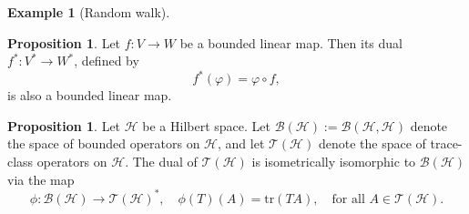 \documentclass[10pt,a4paper]{amsart}
\theoremstyle{definition}
\theoremstyle{definition}
\newtheorem{example}[definition]{Example}
\theoremstyle{definition}
\theoremstyle{definition}
\newtheorem{proposition}[definition]{Proposition}
\theoremstyle{definition}
\theoremstyle{definition}
\begin{document}
\begin{example}[Random walk]










\begin{proposition} \cite[Proposition 2.3.10]{pedersenAnalysisNow1989}
Let \( f : V \to W \) be a bounded linear map. Then its dual \( f^* : V^* \to W^* \), defined by
\[
f^*(\varphi) = \varphi \circ f,
\]
is also a bounded linear map.
\end{proposition}

\begin{proposition} \cite[Theorem 19.2]{conwayCourseOperatorTheory2000}
  Let \(\mathcal{H}\) be a Hilbert space. Let \(\mathcal{B}(\mathcal{H}) := \mathcal{B}(\mathcal{H}, \mathcal{H})\) denote the space of bounded operators on \(\mathcal{H}\), and let \(\mathcal{T}(\mathcal{H})\) denote the space of trace-class operators on \(\mathcal{H}\).
    The dual of \(\mathcal{T}(\mathcal{H})\) is isometrically isomorphic to \(\mathcal{B}(\mathcal{H})\) via the map
    \[
    \phi : \mathcal{B}(\mathcal{H}) \to \mathcal{T}(\mathcal{H})^*, \quad \phi(T)(A) = \mathrm{tr}(TA), \quad \text{for all } A \in \mathcal{T}(\mathcal{H}).
    \]
\end{proposition}



\end{example}
\end{document}

